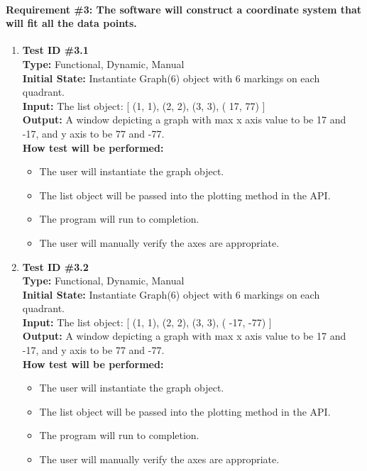 \documentclass[12pt, titlepage]{article}
\begin{document}
	\paragraph{Requirement \#3: The software will construct a coordinate system that will fit all the data points.}
		\begin{enumerate}
			\item{\textbf{Test ID \#3.1\\}}
			\textbf{Type:} Functional, Dynamic, Manual\\
			\textbf{Initial State:} Instantiate Graph(6) object with 6 markings on each quadrant. \\
			\textbf{Input:} The list object: [ (1, 1),  (2, 2), (3, 3), ( 17, 77) ]\\
			\textbf{Output:}  A window depicting a graph with max x axis value to be 17 and -17, and y axis to be 77 and -77. \\
			\textbf{How test will be performed:}
				\begin{itemize}[label={--}]
					\item The user will instantiate the graph object.
					\item The list object will be passed into the plotting method in the API.
					\item The program will run to completion.
					\item The user will manually verify the axes are appropriate.								
				\end{itemize}
					
			\item{\textbf{Test ID \#3.2\\}}
			\textbf{Type:} Functional, Dynamic, Manual\\
			\textbf{Initial State:}  Instantiate Graph(6) object with 6 markings on each quadrant.\\
			\textbf{Input:} The list object: [ (1, 1),  (2, 2), (3, 3), ( -17, -77) ]\\
			\textbf{Output:} A window depicting a graph with max x axis value to be 17 and -17, and y axis to be 77 and -77. \\
			\textbf{How test will be performed:}
				\begin{itemize}[label={--}]
					\item The user will instantiate the graph object.
					\item The list object will be passed into the plotting method in the API.
					\item The program will run to completion.
					\item The user will manually verify the axes are appropriate.
				\end{itemize}							
	\end{enumerate}
\end{document}
